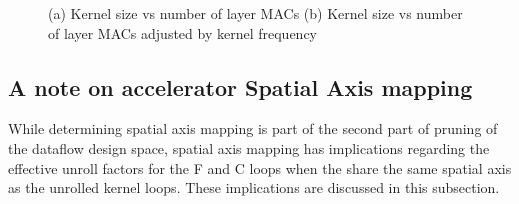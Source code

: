 

\begin{figure}
    \centering
    \caption{(a) Kernel size vs number of layer MACs  (b) Kernel size vs number of layer MACs adjusted by kernel frequency}
    \label{fig:kernel_vs_mac}
\end{figure}


\subsection{A note on accelerator Spatial Axis mapping}
\label{chap:dda:dataflow_dse:GEMM_mode:axis_mapping}

While determining spatial axis mapping is part of the second part of pruning of the
dataflow design space, spatial axis mapping has implications regarding the
effective unroll factors for the F and C loops when the share the same spatial
axis as the unrolled kernel loops. These implications are discussed in this
subsection. 

